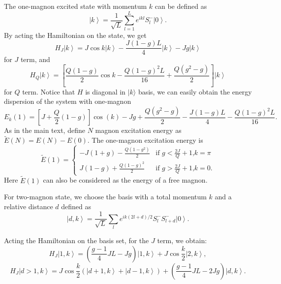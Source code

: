 \documentclass[article,10pt,onecolumn,superscriptaddress,floatfix]{revtex4}
\begin{document}
The one-magnon excited state with momentum $k$ can be defined as
\begin{equation}
\left|k\right\rangle=\frac{1}{\sqrt{L}}\sum_{l=1}^{L}e^{ikl}S_{l}^{-}\left|0\right\rangle.
\end{equation}
By acting the Hamiltonian on the state, we get
\begin{equation}
H_{J}\left|k\right\rangle   =  J \cos k\left|k\right\rangle -\frac{J\left(1-g\right)L}{4}\left|k\right\rangle -Jg\left|k\right\rangle
\end{equation}
for $J$ term, and
\begin{equation}
H_{Q}\left|k\right\rangle =\left[\frac{Q\left(1-g\right)}{2} \cos k-\frac{Q\left(1-g\right)^{2}L}{16}+\frac{Q\left(g^{2}-g\right)}{2}\right]\left|k\right\rangle
\end{equation}
for $Q$ term. Notice that $H$ is diagonal in $|k\rangle$ basis, we can easily obtain the energy dispersion of the system with one-magnon
\begin{equation}
E_{k}(1)   =  \left[J+\frac{Q}{2}\left(1-g\right)\right]{ \cos}\left(k\right)-Jg+\frac{Q\left(g^{2}-g\right)}{2}-\frac{J\left(1-g\right)L}{4}-\frac{Q\left(1-g\right)^{2}L}{16}.
\end{equation}
As in the main text, define $N$ magnon excitation energy as $\tilde{E}(N)=E(N)-E(0)$. The one-magnon excitation energy is
\begin{equation}
\tilde{E}(1) \!=\!
\begin{cases}
-J\left(1+g\right)\!-\!\frac{Q\left(1-g^{2}\right)}{2} &  \text{if $g<\frac{2J}{Q}+1$,$k=\pi$} \\
J\left(1-g\right)+\frac{Q\left(1-g\right)^{2}}{2}  &  \text{if $g>\frac{2J}{Q}+1$,$k=0$.}
\end{cases}
\end{equation}
Here $\tilde{E}(1)$ can also be considered as the energy of a free magnon.


For two-magnon state, we choose the basis with a total momentum $k$ and a relative distance $d$ defined as
\begin{equation}
\left|d,k\right\rangle =\frac{1}{\sqrt{L}}\sum_{l}e^{ik\left(2l+d\right)/2}S_{l}^{-}S_{l+d}^{-}\left|0\right\rangle.
\end{equation}



Acting the Hamiltonian on the basis set, for the $J$ term, we obtain:
\begin{equation}
H_{J}\left|1,k\right\rangle   =  \left(\frac{g-1}{4}JL-Jg\right)\left|1,k\right\rangle +J\cos \frac{k}{2}\left|2,k\right\rangle,
\end{equation}
\begin{equation}
H_{J}\left|d>1,k\right\rangle   = J\cos \frac{k}{2}\left(\left|d+1,k\right\rangle +\left|d-1,k\right\rangle \right)+\left(\frac{g-1}{4}JL-2Jg\right)\left|d,k\right\rangle.
\end{equation}
\end{document}
